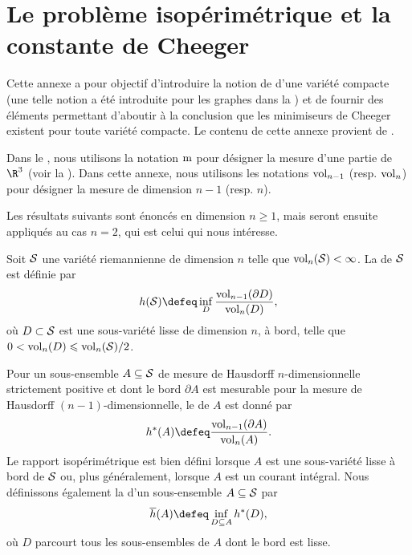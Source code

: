 
\chapter{Le problème isopérimétrique et la constante de Cheeger} \label{sec:cheeger_constant}

Cette annexe a pour objectif d'introduire la notion de  d'une variété compacte (une telle notion a été introduite pour les graphes dans la ) et de fournir des éléments permettant d'aboutir à la conclusion que les minimiseurs de Cheeger existent pour toute variété compacte. Le contenu de cette annexe provient de \cite[Section 3]{benson_cheeger_2016}.

\begin{remarque}
Dans le , nous utilisons la notation $\operatorname{m}$ pour désigner la mesure d'une partie de $\R^3$ (voir la ). Dans cette annexe, nous utilisons les notations $\operatorname{vol}_{n-1}$ (resp. $\operatorname{vol}_n$) pour désigner la mesure de dimension $n - 1$ (resp. $n$).
\end{remarque}

\begin{remarque}
    Les résultats suivants sont énoncés en dimension $n \geqslant 1$, mais seront ensuite appliqués au cas $n = 2$, qui est celui qui nous intéresse.
\end{remarque}

Soit $\mathcal{S}$ une variété riemannienne de dimension $n$ telle que $\operatorname{vol}_n(\mathcal{S}) < \infty$. La  de $\mathcal{S}$ est définie par
\[
h(\surflisse) \defeq \inf_D \frac{\vol_{n - 1}(\partial D)}{\vol_n(D)},
\]
où $D \subset \mathcal{S}$ est une sous-variété lisse de dimension $n$, à bord, telle que $0 < \operatorname{vol}_n(D) \leqslant \operatorname{vol}_n(\mathcal{S}) / 2$.

Pour un sous-ensemble $A \subseteq \mathcal{S}$ de mesure de Hausdorff $n$-dimensionnelle strictement positive et dont le bord $\partial A$ est mesurable pour la mesure de Hausdorff $(n-1)$-dimensionnelle, le  de $A$ est donné par
\begin{equation}
    h^\ast(A) \defeq \frac{\vol_{n-1}(\partial A)}{\vol_n(A)}.
\end{equation}
Le rapport isopérimétrique est bien défini lorsque $A$ est une sous-variété lisse à bord de $\mathcal{S}$ ou, plus généralement, lorsque $A$ est un courant intégral. Nous définissons également la  d'un sous-ensemble $A \subseteq \mathcal{S}$ par
\begin{equation}
\overline{h}(A) \defeq \inf_{D \subseteq A} h^\ast(D),
\end{equation}
où $D$ parcourt tous les sous-ensembles de $A$ dont le bord est lisse.

